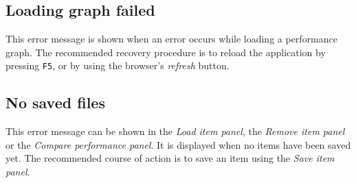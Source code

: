 \subsection{Loading graph failed}
This error message is shown when an error occurs while loading a performance graph. The recommended recovery procedure is to reload the application by pressing \texttt{F5}, or by using the browser's \emph{refresh} button.

\subsection{No saved files}
This error message can be shown in the \emph{Load item panel}, the \emph{Remove item panel} or the \emph{Compare performance panel}. It is displayed when no items have been saved yet. The recommended course of action is to save an item using the \emph{Save item panel}.




